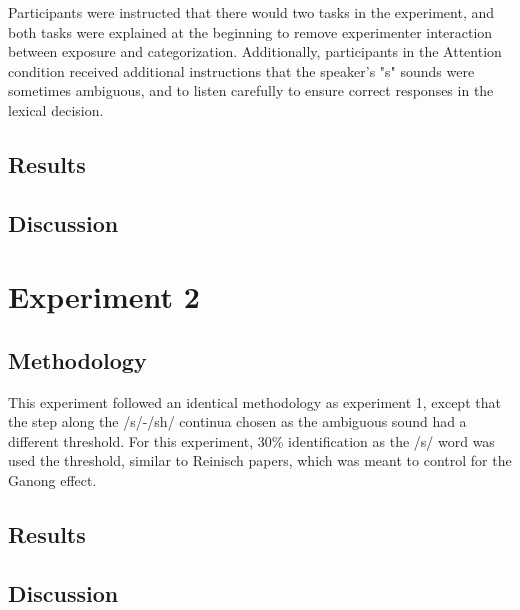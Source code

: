 Participants were instructed that there would two tasks in the experiment, and both tasks were explained at the beginning to remove experimenter interaction between exposure and categorization.  Additionally, participants in the Attention condition received additional instructions that the speaker's "s" sounds were sometimes ambiguous, and to listen carefully to ensure correct responses in the lexical decision.


\subsection{Results}

\subsection{Discussion}

\section{Experiment 2}

\subsection{Methodology}

This experiment followed an identical methodology as experiment 1, except that the step along the /s/-/sh/ continua chosen as the ambiguous sound had a different threshold.  For this experiment, 30\% identification as the /s/ word was used the threshold, similar to Reinisch papers, which was meant to control for the Ganong effect.

\subsection{Results}

\subsection{Discussion}